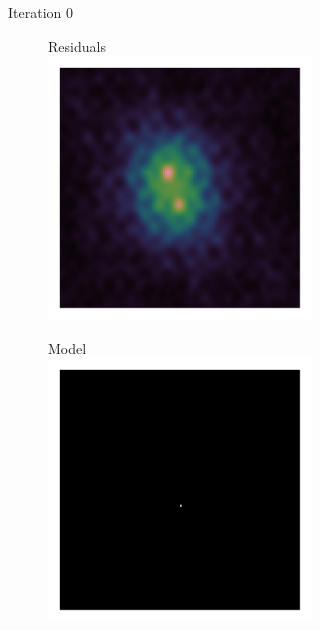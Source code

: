 \begin{figure}[h]
\begin{subfigure}[b]{0.48\linewidth}
\begin{subfigure}[b]{0.48\linewidth}
		\end{subfigure}
		\caption{Iteration 0}
	\end{subfigure}
	\begin{subfigure}[b]{0.48\linewidth}
		\begin{subfigure}[b]{0.48\linewidth}
			\centering
			Residuals\\
			\includegraphics[width=1.0\linewidth, clip, trim= 1.0in 1.0in 1.0in 1.0in]{./chapters/01.intro/cleanExample/dirty_CLEAN_1.png}
		\end{subfigure}
		\begin{subfigure}[b]{0.48\linewidth}
			\centering
			Model\\
			\includegraphics[width=1.0\linewidth, clip, trim= 1.0in 1.0in 1.0in 1.0in]{./chapters/01.intro/cleanExample/model_CLEAN_1.png}

\end{subfigure}
\end{subfigure}
\end{figure}
